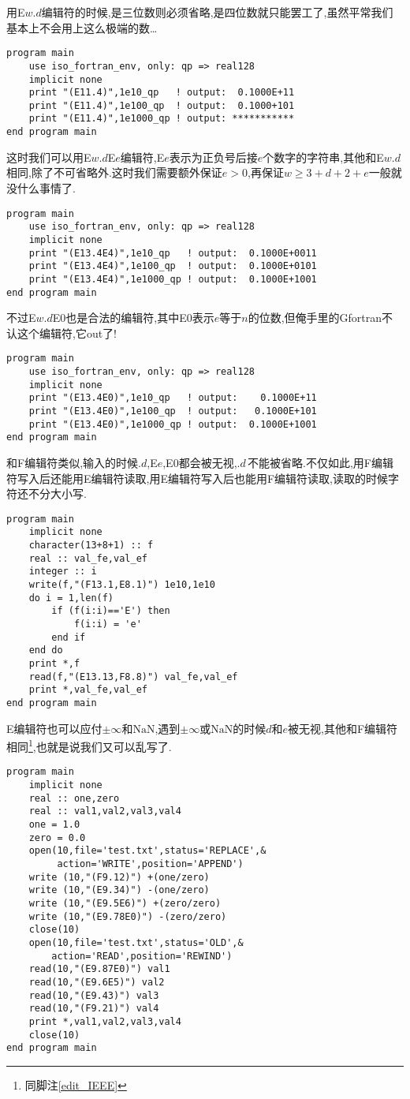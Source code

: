 用E$w.d$编辑符的时候,是三位数则必须省略,是四位数就只能罢工了,虽然平常我们基本上不会用上这么极端的数\dots
\begin{lstlisting}
program main
    use iso_fortran_env, only: qp => real128
    implicit none
    print "(E11.4)",1e10_qp   ! output:  0.1000E+11
    print "(E11.4)",1e100_qp  ! output:  0.1000+101
    print "(E11.4)",1e1000_qp ! output: ***********
end program main
\end{lstlisting}
这时我们可以用E$w.d$E$e$编辑符,E$e$表示为正负号后接$e$个数字的字符串,其他和E$w.d$相同,除了不可省略外.这时我们需要额外保证$e>0$,再保证$w\geqslant 3+d+2+e$一般就没什么事情了.
\begin{lstlisting}
program main
    use iso_fortran_env, only: qp => real128
    implicit none
    print "(E13.4E4)",1e10_qp   ! output:  0.1000E+0011
    print "(E13.4E4)",1e100_qp  ! output:  0.1000E+0101
    print "(E13.4E4)",1e1000_qp ! output:  0.1000E+1001
end program main
\end{lstlisting}
不过E$w.d$E0也是合法的编辑符,其中E0表示$e$等于$n$的位数,但俺手里的Gfortran不认这个编辑符,它out了!
\begin{lstlisting}
program main
    use iso_fortran_env, only: qp => real128
    implicit none
    print "(E13.4E0)",1e10_qp   ! output:    0.1000E+11
    print "(E13.4E0)",1e100_qp  ! output:   0.1000E+101
    print "(E13.4E0)",1e1000_qp ! output:  0.1000E+1001
end program main
\end{lstlisting}

和F编辑符类似,输入的时候$.d$,E$e$,E0都会被无视,$.d\,$不能被省略.不仅如此,用F编辑符写入后还能用E编辑符读取,用E编辑符写入后也能用F编辑符读取,读取的时候字符还不分大小写.
\begin{lstlisting}
program main
    implicit none
    character(13+8+1) :: f
    real :: val_fe,val_ef
    integer :: i
    write(f,"(F13.1,E8.1)") 1e10,1e10
    do i = 1,len(f)
        if (f(i:i)=='E') then
            f(i:i) = 'e'
        end if
    end do
    print *,f
    read(f,"(E13.13,F8.8)") val_fe,val_ef
    print *,val_fe,val_ef
end program main
\end{lstlisting}

E编辑符也可以应付$\pm\infty$和$\text{NaN}$,遇到$\pm\infty$或$\text{NaN}$的时候$d$和$e$被无视,其他和F编辑符相同\footnote{同脚注\ref{edit_IEEE}},也就是说我们又可以乱写了.
\begin{lstlisting}
program main
    implicit none
    real :: one,zero
    real :: val1,val2,val3,val4
    one = 1.0
    zero = 0.0
    open(10,file='test.txt',status='REPLACE',&
         action='WRITE',position='APPEND')
    write (10,"(F9.12)") +(one/zero)
    write (10,"(E9.34)") -(one/zero)
    write (10,"(E9.5E6)") +(zero/zero)
    write (10,"(E9.78E0)") -(zero/zero)
    close(10)
    open(10,file='test.txt',status='OLD',&
        action='READ',position='REWIND')
    read(10,"(E9.87E0)") val1
    read(10,"(E9.6E5)") val2
    read(10,"(E9.43)") val3
    read(10,"(F9.21)") val4
    print *,val1,val2,val3,val4
    close(10)
end program main
\end{lstlisting}

